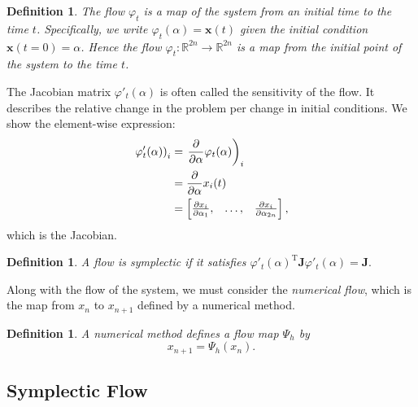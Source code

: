 \documentclass{report}
\theoremstyle{exampstyle} \newtheorem{example}[theorem]{Example}
\theoremstyle{exampstyle} \newtheorem{remark}[theorem]{Remark}
\theoremstyle{exampstyle} \newtheorem{definition}[theorem]{Definition}
\theoremstyle{exampstyle} \newtheorem{lemma}[theorem]{Lemma}
\theoremstyle{exampstyle} \newtheorem{proposition}[theorem]{Proposition}
\begin{document}
\begin{definition}
	The flow $\varphi_t$ is a map of the system from an initial time to the time $t$.
	Specifically, we write $\varphi_t(\alpha) = \mathbf{x}(t)$ given the initial condition $\mathbf{x}(t=0) = \alpha$. Hence the flow $\varphi_t:\mathds{R}^{2n}\rightarrow \mathds{R}^{2n}$ is a map from the initial point of the system to the time $t$.
\end{definition}
The Jacobian matrix $\varphi'_t({\alpha})$ is often called the sensitivity of the flow.
It describes the relative change in the problem per change in initial conditions.
We show the element-wise expression: %
\begin{align*}
	\left. \varphi'_t(\alpha) \right)_i &= \left. \frac{\partial}{\partial \alpha} \varphi_t(\alpha) \right)_i \\
	&= \frac{\partial}{\partial \alpha} x_i(t) \\
	&= \begin{bmatrix}
		\frac{\partial x_i}{\partial \alpha_1}, & \mathellipsis, & \frac{\partial x_i}{\partial \alpha_{2n}}
	\end{bmatrix},
\end{align*}
which is the Jacobian.
\begin{definition}
	A flow is symplectic if it satisfies $\varphi'_t(\alpha)^\mathrm{T} \mathbf{J} \varphi'_t(\alpha) = \mathbf{J}.$
\end{definition}
Along with the flow of the system, we must consider the \textit{numerical flow},
which is the map from $x_n$ to $x_{n+1}$ defined by a numerical method.
\begin{definition}
	A numerical method defines a flow map $\Psi_h$ by
	\begin{equation*}
		x_{n+1} = \Psi_h(x_n).
	\end{equation*}
\end{definition}

\subsection{Symplectic Flow}
\end{document}
